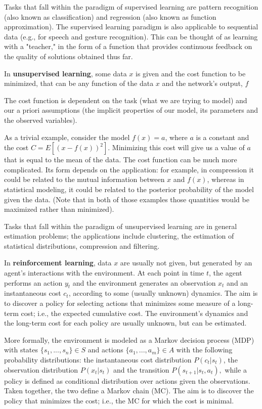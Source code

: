 \documentclass[a4paper,12pt]{article}
\begin{document}
Tasks that fall within the paradigm of supervised learning are pattern recognition (also known as classification) and regression (also known as function approximation). The supervised learning paradigm is also applicable to sequential data (e.g., for speech and gesture recognition). This can be thought of as learning with a "teacher," in the form of a function that provides continuous feedback on the quality of solutions obtained thus far.

In \textbf{unsupervised learning}, some data $ x $ is given and the cost function to be minimized, that can be any function of the data $ x $ and the network's output, $f$

The cost function is dependent on the task (what we are trying to model) and our a priori assumptions (the implicit properties of our model, its parameters and the observed variables).

As a trivial example, consider the model $f(x) = a$, where $ a $ is a constant and the cost $ C=E[(x - f(x))^2] $. Minimizing this cost will give us a value of $ a $ that is equal to the mean of the data. The cost function can be much more complicated. Its form depends on the application: for example, in compression it could be related to the mutual information between $ x $ and $ f(x) $, whereas in statistical modeling, it could be related to the posterior probability of the model given the data. (Note that in both of those examples those quantities would be maximized rather than minimized).

Tasks that fall within the paradigm of unsupervised learning are in general estimation problems; the applications include clustering, the estimation of statistical distributions, compression and filtering.

In \textbf{reinforcement learning}, data $ x $ are usually not given, but generated by an agent's interactions with the environment. At each point in time $ t $, the agent performs an action $ y_t  $ and the environment generates an observation $ x_t $ and an instantaneous cost $ c_t $, according to some (usually unknown) dynamics. The aim is to discover a policy for selecting actions that minimizes some measure of a long-term cost; i.e., the expected cumulative cost. The environment's dynamics and the long-term cost for each policy are usually unknown, but can be estimated.

More formally, the environment is modeled as a Markov decision process (MDP) with states $ \{s_1,...,s_n\}\in S $ and actions $\{a_1,...,a_m\} \in A $ with the following probability distributions: the instantaneous cost distribution $ P(c_t|s_t) $, the observation distribution $ P(x_t|s_t) $ and the transition $ P(s_{t+1}|s_t, a_t), $ while a policy is defined as conditional distribution over actions given the observations. Taken together, the two define a Markov chain (MC). The aim is to discover the policy that minimizes the cost; i.e., the MC for which the cost is minimal.
\end{document}
